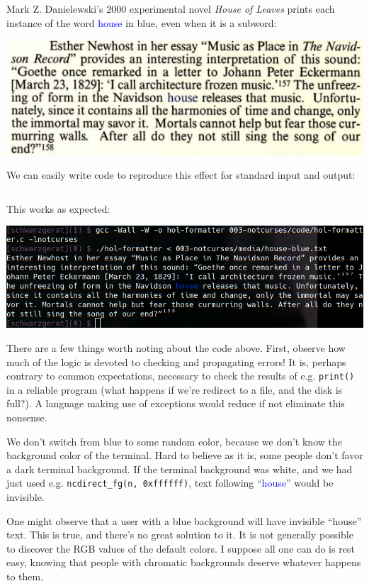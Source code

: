 \documentclass[letterpaper,10pt]{article}
\begin{document}
Mark Z. Danielewski's 2000 experimental novel \textit{House of Leaves} prints each 
instance of the word \textcolor{blue}{house} in blue, even when it is a subword:

\begin{center}
\includegraphics[width=.5\linewidth]{house-blue.png}
\end{center}

We can easily write code to reproduce this effect for standard input and output:

\begin{listing}[ht]
\inputminted{C}{code/hol-formatter.c}
\end{listing}

This works as expected:

\begin{center}
\includegraphics[width=.75\linewidth]{hol-formatted.png}
\end{center}

There are a few things worth noting about the code above. First, observe how
much of the logic is devoted to checking and propagating errors! It is, perhaps
contrary to common expectations, necessary to check the results of e.g.
\texttt{print()} in a reliable program (what happens if we're redirect to a file, and
the disk is full?). A language making use of exceptions would reduce if not
eliminate this nonsense.

We don't switch from blue to some random color, because we don't know the
background color of the terminal. Hard to believe as it is, some people don't
favor a dark terminal background. If the terminal background was white, and we
had just used e.g. \texttt{ncdirect\_fg(n, 0xffffff)}, text following
``\textcolor{blue}{house}'' would be invisible.

One might observe that a user with a blue background will have invisible ``house'' text.
This is true, and there's no great solution to it. It is not generally possible to
discover the RGB values of the default colors. I suppose all one can do is rest easy,
knowing that people with chromatic backgrounds deserve whatever happens to them.
\end{document}
